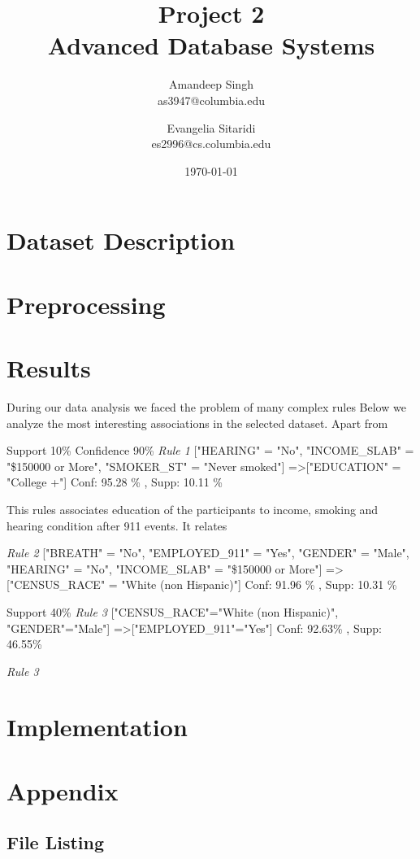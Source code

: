 \documentclass[11pt]{article}
\title{Project 2 \\ Advanced Database Systems \\}
\author{
Amandeep Singh\\as3947@columbia.edu
\and
Evangelia Sitaridi \\ es2996@cs.columbia.edu
}
\date{\today}
\begin{document}
\maketitle


\section{Dataset Description}

\section{Preprocessing}

\section{Results}

During our data analysis we faced the problem of many complex rules 
Below we analyze the most interesting associations in the selected dataset. Apart from 

Support 10\% Confidence 90\%
\textit{Rule 1}
["HEARING" = "No", "INCOME_SLAB" = "\$150000 or More", "SMOKER_ST" = "Never smoked"] =>["EDUCATION" = "College +"] Conf: 95.28 \% , Supp: 10.11 \%

This rules associates education of the participants to income, smoking and hearing condition after 911 events. It relates 

\textit{Rule 2}
["BREATH" = "No", "EMPLOYED_911" = "Yes", "GENDER" = "Male", "HEARING" = "No", "INCOME_SLAB" = "\$150000 or More"] =>["CENSUS_RACE" = "White (non Hispanic)"] Conf: 91.96 \% , Supp: 10.31 \% 

Support 40\%
\textit{Rule 3}
["CENSUS_RACE"="White (non Hispanic)", "GENDER"="Male"] =>["EMPLOYED_911"="Yes"] Conf: 92.63\% , Supp: 46.55\% 


\textit{Rule 3}


\section{Implementation}

   
\section* {Appendix}

\subsection* {File Listing}
\end{document}
